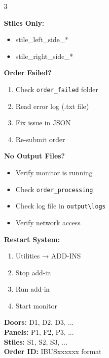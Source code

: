 \documentclass[10pt,landscape]{article}
\begin{document}
\begin{multicols}{3}
\begin{tcolorbox}[colback=blue!10,colframe=blue!70!black,title=\textbf{Required Parameters}]
\textbf{Stiles Only:}
\begin{itemize}[noitemsep,leftmargin=*]
    \item stile\_left\_side\_*
    \item stile\_right\_side\_*
\end{itemize}
\end{tcolorbox}

\begin{tcolorbox}[colback=red!10,colframe=red!70!black,title=\textbf{Troubleshooting}]
\textbf{Order Failed?}
\begin{enumerate}[noitemsep,leftmargin=*]
    \item Check \texttt{order\_failed} folder
    \item Read error log (.txt file)
    \item Fix issue in JSON
    \item Re-submit order
\end{enumerate}

\textbf{No Output Files?}
\begin{itemize}[noitemsep,leftmargin=*]
    \item Verify monitor is running
    \item Check \texttt{order\_processing}
    \item Check log file in \texttt{output\textbackslash logs}
    \item Verify network access
\end{itemize}

\textbf{Restart System:}
\begin{enumerate}[noitemsep,leftmargin=*]
    \item Utilities → ADD-INS
    \item Stop add-in
    \item Run add-in
    \item Start monitor
\end{enumerate}
\end{tcolorbox}

\vspace{0.2cm}

\begin{tcolorbox}[colback=gray!10,colframe=gray!70!black,title=\textbf{Component IDs}]
\textbf{Doors:} D1, D2, D3, ...\\
\textbf{Panels:} P1, P2, P3, ...\\
\textbf{Stiles:} S1, S2, S3, ...\\

\textbf{Order ID:} IBUSxxxxxx format
\end{tcolorbox}


\end{multicols}
\end{document}
